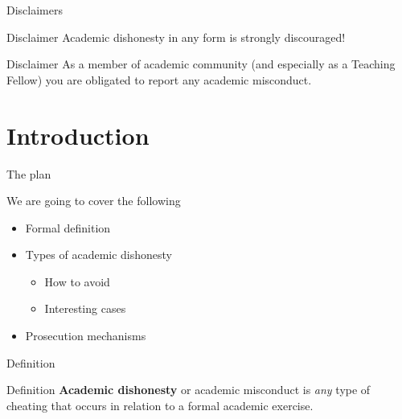 
\begin{frame}{Disclaimers}
	
	\begin{alertblock}{Disclaimer}
		Academic dishonesty in any form is strongly discouraged!
	\end{alertblock}

	\begin{alertblock}{Disclaimer}
		As a member of academic community (and especially as a Teaching Fellow) you are obligated to report any academic misconduct.
	\end{alertblock}

\end{frame}

\section{Introduction}

	\begin{frame}{The plan}
		
		We are going to cover the following

		\begin{itemize}
			\item
				Formal definition
			\item 
				Types of academic dishonesty
				\begin{itemize}
					\item 
						How to avoid
					\item 
						Interesting cases
				\end{itemize}
			\item 
				Prosecution mechanisms
		\end{itemize}

	\end{frame}

	\begin{frame}{Definition}
		
		\begin{block}{Definition}
			\textbf{Academic dishonesty} or academic misconduct is \emph{any} type of cheating that occurs in relation to a formal academic exercise.
		\end{block}	

	\end{frame}


